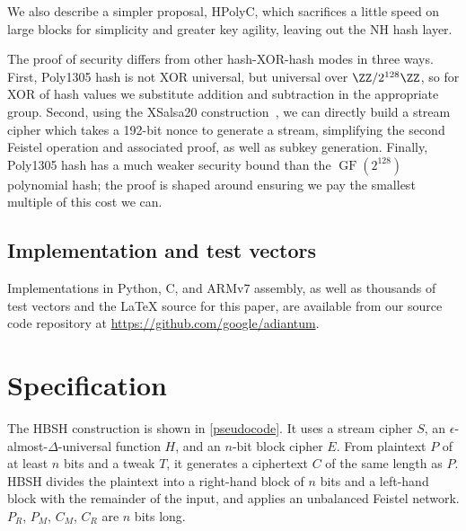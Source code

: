 \documentclass[journal=tosc,preprint,floatrow,submission]{iacrtrans}
\DeclareMathOperator{\GF}{GF}
\begin{document}
We also describe a simpler proposal, HPolyC, which sacrifices a little speed on large blocks
for simplicity and greater key agility, leaving out the NH hash layer.

The proof of security differs from other hash-XOR-hash modes in three ways. First,
Poly1305 hash is not XOR universal, but universal over $\ZZ/2^{128}\ZZ$,
so for XOR of hash values we substitute addition and subtraction in the appropriate group.
Second, using the XSalsa20 construction~\cite{xsalsa}, we can directly
build a stream cipher which takes a 192-bit nonce to generate a stream, simplifying
the second Feistel operation and associated proof, as well as subkey generation.
Finally, Poly1305 hash has a much weaker security bound than the $\GF(2^{128})$ polynomial hash;
the proof is shaped around ensuring we pay the smallest multiple of this cost we can.

\subsection{Implementation and test vectors}
Implementations in Python, C, and ARMv7 assembly, as well as thousands of test
vectors and the \LaTeX{} source for this paper,  are available from our source code
repository at \url{https://github.com/google/adiantum}.

\section{Specification}
The HBSH construction is shown in \autoref{pseudocode}. It uses a stream cipher $S$, an
$\epsilon$-almost-$\Delta$-universal function $H$, and an $n$-bit block cipher $E$.
From plaintext $P$ of at least $n$ bits and a tweak $T$,
it generates a ciphertext $C$ of the same length as $P$.
HBSH divides the plaintext into a right-hand block of $n$ bits and a left-hand block with
the remainder of the input, and applies an unbalanced Feistel network.
$P_R$, $P_M$, $C_M$, $C_R$ are $n$ bits long.
\end{document}
